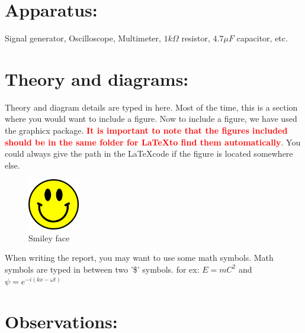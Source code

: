 \documentclass[11pt]{report}	%
\begin{document}
\section*{Apparatus:}
Signal generator, Oscilloscope, Multimeter, $1 k\Omega $ resistor, $4.7 \mu F$ capacitor, etc. 	 	%

\section*{Theory and diagrams:}



Theory and diagram details are typed in here. Most of the time, this is a section where you would want to include a figure. Now to include a figure, we have used the graphicx package. \textcolor{red}{\textbf{It is important to note that the figures included should be in the same folder for \LaTeX to find them automatically}}. You could always give the path in the \LaTeX code if the figure is located somewhere else.
\begin{figure}[h] %
\centering  %
\includegraphics[width=0.2\textwidth]{Smiley face} %
\caption{Smiley face} %
\end{figure}


When writing the report, you may want to use some math symbols. Math symbols are typed in between two '\$' symbols. for ex: $E = m C^2$ and $\psi = e^{-i (kx- \omega t)}$


\section*{Observations:}
\end{document}
